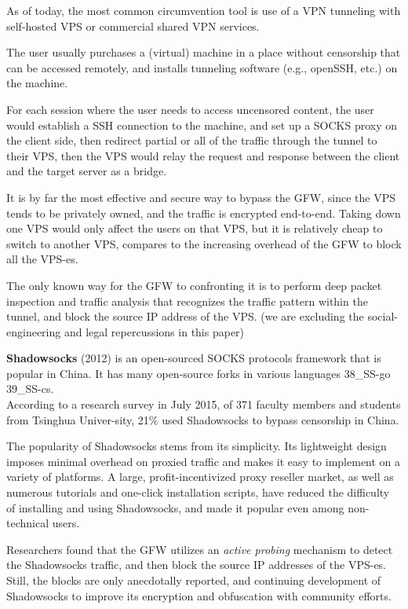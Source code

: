 \documentclass[nonacm,sigplan,screen]{acmart}
\begin{document}
As of today, the most common circumvention tool is use of a VPN
tunneling with self-hosted VPS or commercial shared VPN services.

The user usually purchases a (virtual) machine in a place without
censorship that can be accessed remotely, and installs tunneling
software (e.g., openSSH, etc.) on the machine.

For each session where the user needs to access uncensored content, the
user would establish a SSH connection to the machine, and set up a SOCKS
proxy on the client side, then redirect partial or all of the traffic
through the tunnel to their VPS, then the VPS would relay the request
and response between the client and the target server as a bridge.

It is by far the most effective and secure way to bypass the GFW, since
the VPS tends to be privately owned, and the traffic is encrypted
end-to-end. Taking down one VPS would only affect the users on that VPS,
but it is relatively cheap to switch to another VPS, compares to the
increasing overhead of the GFW to block all the VPS-es.

The only known way for the GFW to confronting it is to perform deep
packet inspection and traffic analysis that recognizes the traffic
pattern within the tunnel, and block the source IP address of the VPS.
(we are excluding the social-engineering and legal repercussions in this
paper)

\textbf{Shadowsocks} (2012) is an open-sourced SOCKS protocols framework
that is popular in China. It has many open-source forks in various
languages \cite{36_SS-py} \cite{37_SS-rust} 38\_SS-go 39\_SS-cs.\\
According to a research survey in July 2015, of 371 faculty members and
students from Tsinghua Univer-sity, 21\% used Shadowsocks to bypass
censorship in China. \cite{52_googleScholar}

The popularity of Shadowsocks stems from its simplicity. Its lightweight
design imposes minimal overhead on proxied traffic and makes it easy to
implement on a variety of platforms. A large, profit-incentivized proxy
reseller market, as well as numerous tutorials and one-click
installation scripts, have reduced the difficulty of installing and
using Shadowsocks, and made it popular even among non-technical users.

Researchers found that the GFW utilizes an \emph{active probing}
mechanism to detect the Shadowsocks traffic, and then block the source
IP addresses of the VPS-es. \cite{30_SSActiveProb} Still, the blocks are only
anecdotally reported, and continuing development of Shadowsocks to
improve its encryption and obfuscation with community efforts.
\end{document}
